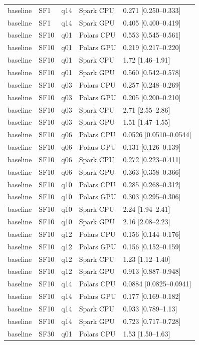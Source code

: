 \begin{longtable}{lllll}
baseline & SF1 & q14 & Spark CPU & 0.271 [0.250--0.333] \\
baseline & SF1 & q14 & Spark GPU & 0.405 [0.400--0.419] \\
baseline & SF10 & q01 & Polars CPU & 0.553 [0.545--0.561] \\
baseline & SF10 & q01 & Polars GPU & 0.219 [0.217--0.220] \\
baseline & SF10 & q01 & Spark CPU & 1.72 [1.46--1.91] \\
baseline & SF10 & q01 & Spark GPU & 0.560 [0.542--0.578] \\
baseline & SF10 & q03 & Polars CPU & 0.257 [0.248--0.269] \\
baseline & SF10 & q03 & Polars GPU & 0.205 [0.200--0.210] \\
baseline & SF10 & q03 & Spark CPU & 2.71 [2.55--2.86] \\
baseline & SF10 & q03 & Spark GPU & 1.51 [1.47--1.55] \\
baseline & SF10 & q06 & Polars CPU & 0.0526 [0.0510--0.0544] \\
baseline & SF10 & q06 & Polars GPU & 0.131 [0.126--0.139] \\
baseline & SF10 & q06 & Spark CPU & 0.272 [0.223--0.411] \\
baseline & SF10 & q06 & Spark GPU & 0.363 [0.358--0.366] \\
baseline & SF10 & q10 & Polars CPU & 0.285 [0.268--0.312] \\
baseline & SF10 & q10 & Polars GPU & 0.303 [0.295--0.306] \\
baseline & SF10 & q10 & Spark CPU & 2.24 [1.94--2.41] \\
baseline & SF10 & q10 & Spark GPU & 2.16 [2.08--2.23] \\
baseline & SF10 & q12 & Polars CPU & 0.156 [0.144--0.176] \\
baseline & SF10 & q12 & Polars GPU & 0.156 [0.152--0.159] \\
baseline & SF10 & q12 & Spark CPU & 1.23 [1.12--1.40] \\
baseline & SF10 & q12 & Spark GPU & 0.913 [0.887--0.948] \\
baseline & SF10 & q14 & Polars CPU & 0.0884 [0.0825--0.0941] \\
baseline & SF10 & q14 & Polars GPU & 0.177 [0.169--0.182] \\
baseline & SF10 & q14 & Spark CPU & 0.933 [0.789--1.13] \\
baseline & SF10 & q14 & Spark GPU & 0.723 [0.717--0.728] \\
baseline & SF30 & q01 & Polars CPU & 1.53 [1.50--1.63] \\

\end{longtable}
